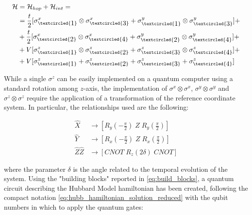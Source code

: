 \documentclass[twoside,twocolumn]{article}
\begin{document}
\begin{equation}\label{eq:hubb_hamiltonian_solution_reduced}
\begin{aligned}
\mathcal{H} &= \mathcal{H}_{hop} + \mathcal{H}_{int} = \\
&= \frac{t}{2} [ \sigma^x_{\textcircled{\raisebox{-0.9pt}{1}}} \otimes \sigma^x_{\textcircled{\raisebox{-0.9pt}{3}}}
  + \sigma^y_{\textcircled{\raisebox{-0.9pt}{1}}} \otimes \sigma^y_{\textcircled{\raisebox{-0.9pt}{3}}} ] + \\
&+ \frac{t}{2} [ \sigma^x_{\textcircled{\raisebox{-0.9pt}{2}}} \otimes \sigma^x_{\textcircled{\raisebox{-0.9pt}{4}}}
  + \sigma^y_{\textcircled{\raisebox{-0.9pt}{2}}} \otimes \sigma^y_{\textcircled{\raisebox{-0.9pt}{4}}} ] + \\
&+ V [\sigma^z_{\textcircled{\raisebox{-0.9pt}{1}}} \otimes \sigma^z_{\textcircled{\raisebox{-0.9pt}{2}}} +
      \sigma^z_{\textcircled{\raisebox{-0.9pt}{3}}} \otimes \sigma^z_{\textcircled{\raisebox{-0.9pt}{4}}} ] +\\
&+ V [\sigma^z_{\textcircled{\raisebox{-0.9pt}{1}}} + \sigma^z_{\textcircled{\raisebox{-0.9pt}{2}}} +
      \sigma^z_{\textcircled{\raisebox{-0.9pt}{3}}} + \sigma^z_{\textcircled{\raisebox{-0.9pt}{4}}}]\\
\end{aligned}
\end{equation}


While a single $\sigma^z$ can be easily implemented on a quantum computer using a standard rotation among $z$-axis,
the implementation of $\sigma^x \otimes \sigma^x$, $\sigma^y \otimes \sigma^y$ and $\sigma^z \otimes \sigma^z$ require
the application of a transformation of the reference coordinate system. In particular, the relationships
used are the following:

\begin{equation}\label{eq:build_blocks}
\begin{aligned}
\hat{X} &\rightarrow [R_y(-\frac{\pi}{2}) \; Z \; R_y(\frac{\pi}{2})]\\
\hat{Y} &\rightarrow [R_x(-\frac{\pi}{2}) \; Z \; R_x(\frac{\pi}{2})]\\
\hat{Z}\hat{Z} &\rightarrow [CNOT \; R_z(2\delta) \; CNOT]
\end{aligned}
\end{equation}

where the parameter $\delta$ is the angle related to the temporal evolution of the system.
Using the "building blocks" reported in \ref{eq:build_blocks}, a quantum circuit describing the Hubbard Model hamiltonian
has been created, following the compact notation \ref{eq:hubb_hamiltonian_solution_reduced} with the qubit numbers in which to apply the quantum gates:
\end{document}
